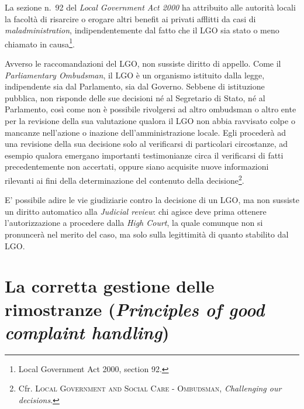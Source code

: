 \documentclass[12pt,it,a4paper,]{report}
\begin{document}
La sezione n.~92 del \emph{Local Government Act 2000} ha attribuito alle
autorità locali la facoltà di risarcire o erogare altri benefit ai
privati afflitti da casi di \emph{maladministration}, indipendentemente
dal fatto che il LGO sia stato o meno chiamato in causa\footnote{Local
  Government Act 2000, section 92.}.

Avverso le raccomandazioni del LGO, non sussiste diritto di appello.
Come il \emph{Parliamentary Ombudsman}, il LGO è un organismo istituito
dalla legge, indipendente sia dal Parlamento, sia dal Governo. Sebbene
di istituzione pubblica, non risponde delle sue decisioni né al
Segretario di Stato, né al Parlamento, così come non è possibile
rivolgersi ad altro ombudsman o altro ente per la revisione della sua
valutazione qualora il LGO non abbia ravvisato colpe o mancanze
nell'azione o inazione dell'amministrazione locale. Egli procederà ad
una revisione della sua decisione solo al verificarsi di particolari
circostanze, ad esempio qualora emergano importanti testimonianze circa
il verificarsi di fatti precedentemente non accertati, oppure siano
acquisite nuove informazioni rilevanti ai fini della determinazione del
contenuto della decisione\footnote{Cfr. \textsc{Local Government and
  Social Care - Ombudsman}, \emph{Challenging our decisions}.}.

E' possibile adire le vie giudiziarie contro la decisione di un LGO, ma
non sussiste un diritto automatico alla \emph{Judicial review}: chi
agisce deve prima ottenere l'autorizzazione a procedere dalla \emph{High
Court}, la quale comunque non si pronuncerà nel merito del caso, ma solo
sulla legittimità di quanto stabilito dal LGO.

\hypertarget{la-corretta-gestione-delle-rimostranze-principles-of-good-complaint-handling}{%
\section{\texorpdfstring{La corretta gestione delle rimostranze
(\emph{Principles of good complaint
handling})}{La corretta gestione delle rimostranze (Principles of good complaint handling)}}\label{la-corretta-gestione-delle-rimostranze-principles-of-good-complaint-handling}}
\end{document}
